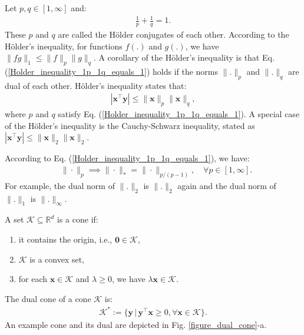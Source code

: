 \documentclass[lang=cn,10pt]{gorgeousnbook}
\numberwithin{equation}{section}%
\numberwithin{figure}{section}%
\begin{document}
\begin{lemma}
Let $p,q \in [1, \infty]$ and:
\begin{align}\label{Holder_inequality_1p_1q_equals_1}
\frac{1}{p} + \frac{1}{q} = 1.
\end{align}
These $p$ and $q$ are called the H{\"o}lder conjugates of each other. According to the H{\"o}lder's inequality, for functions $f(.)$ and $g(.)$, we have $\|fg\|_1 \leq \|f\|_p \|g\|_q$. 
A corollary of the H{\"o}lder's inequality is that Eq. (\ref{Holder_inequality_1p_1q_equals_1}) holds if the norms $\|.\|_p$ and $\|.\|_q$ are dual of each other. H{\"o}lder's inequality states that:
\begin{align*}
|\boldsymbol{x}^\top \boldsymbol{y}| \leq \|\boldsymbol{x}\|_p \|\boldsymbol{x}\|_q,
\end{align*}
where $p$ and $q$ satisfy Eq. (\ref{Holder_inequality_1p_1q_equals_1}). A special case of the H{\"o}lder's inequality is the Cauchy-Schwarz inequality, stated as $|\boldsymbol{x}^\top \boldsymbol{y}| \leq \|\boldsymbol{x}\|_2 \|\boldsymbol{x}\|_2$.
\end{lemma}

According to Eq. (\ref{Holder_inequality_1p_1q_equals_1}), we have:
\begin{align}\label{equation_dual_norm_calculation}
&\|\cdot\|_p \implies \|\cdot\|_* = \|\cdot\|_{p / (p-1)}, \quad \forall p \in [1, \infty].
\end{align}
For example, the dual norm of $\|.\|_2$ is $\|.\|_2$ again and the dual norm of $\|.\|_1$ is $\|.\|_\infty$. 


\begin{definition}
A set $\mathcal{K} \subseteq \mathbb{R}^d$ is a cone if:
\begin{enumerate}
\item it contains the origin, i.e., $\boldsymbol{0} \in \mathcal{K}$,
\item $\mathcal{K}$ is a convex set,
\item for each $\boldsymbol{x} \in \mathcal{K}$ and $\lambda \geq 0$, we have $\lambda \boldsymbol{x} \in \mathcal{K}$.
\end{enumerate}
The dual cone of a cone $\mathcal{K}$ is:
\begin{align*}
\mathcal{K}^* := \{\boldsymbol{y}\, |\, \boldsymbol{y}^\top \boldsymbol{x} \geq 0, \forall \boldsymbol{x} \in \mathcal{K}\}.
\end{align*}
An example cone and its dual are depicted in Fig. \ref{figure_dual_cone}-a.
\end{definition}
\end{document}
